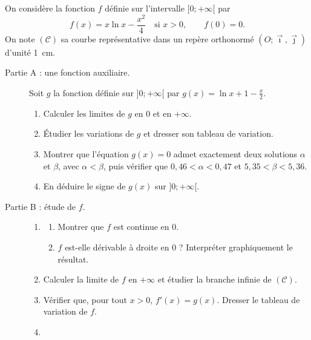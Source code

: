 \begin{exo}
\label{exo:pb x ln x}
      On consid\`ere la fonction $f$ d\'efinie sur l'intervalle $[0 ; +\infty[$ par
      \[
            f(x) = x \ln x - \frac{x^2}{4} \quad \text{si } x > 0, \qquad f(0) = 0 .
      \]
      On note $(\mathscr{C})$ sa courbe repr\'esentative dans un rep\`ere orthonorm\'e
      $(O ; \vec{\imath} , \vec{\jmath})$ d'unit\'e 1~cm.
      \begin{description}
            \item[Partie A : une fonction auxiliaire.]
                  Soit $g$ la fonction d\'efinie sur $]0 ; +\infty[$ par $g(x) = \ln x + 1 - \frac{x}{2}$.
                  \begin{enumerate}
                        \item Calculer les limites de $g$ en $0$ et en $+\infty$.
                        \item \'Etudier les variations de $g$ et dresser son tableau de variation.
                        \item Montrer que l'\'equation $g(x) = 0$ admet exactement deux solutions $\alpha$ et $\beta$,
                              avec $\alpha < \beta$, puis v\'erifier que
                              $0{,}46 < \alpha < 0{,}47$ et $5{,}35 < \beta < 5{,}36$.
                        \item En d\'eduire le signe de $g(x)$ sur $]0 ; +\infty[$.
                  \end{enumerate}
            \item[Partie B : \'etude de $f$.]
                  \begin{enumerate}
                        \item \begin{enumerate}
                                    \item Montrer que $f$ est continue en $0$.
                                    \item $f$ est-elle d\'erivable \`a droite en $0$ ?
                                          Interpr\'eter graphiquement le r\'esultat.
                              \end{enumerate}
                        \item Calculer la limite de $f$ en $+\infty$ et \'etudier la branche infinie de $(\mathscr{C})$.
                        \item V\'erifier que, pour tout $x > 0$, $f'(x) = g(x)$.
                              Dresser le tableau de variation de $f$.
                        \item \begin{enumerate}

\end{enumerate}
\end{enumerate}
\end{description}
\end{exo}
